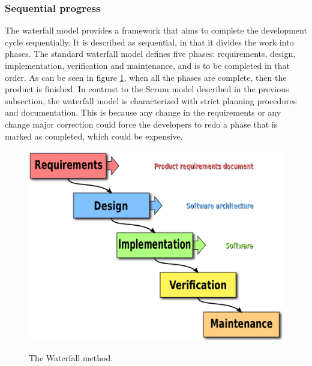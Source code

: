 \subsubsection{Sequential progress}
The waterfall model provides a framework that aims to complete the development cycle sequentially. It is described as sequential, in that it divides the work into phases. The standard waterfall model defines five phases: requirements, design, implementation, verification and maintenance, and is to be completed in that order. As can be seen in figure \ref{fig:Waterfall}, when all the phases are complete, then the product is finished. In contrast to the Scrum model described in the previous subsection, the waterfall model is characterized with strict planning procedures and documentation. This is because any change in the requirements or any change major correction could force the developers to redo a phase that is marked as completed, which could be expensive.\cite{wf}
\\
\begin{figure}[h]
    \centering
    \includegraphics[scale=0.2]{images/Waterfall_model.png}
    \caption{The Waterfall method.}
    \label{fig:Waterfall}
    \cite{wf}
\end{figure}
\\
